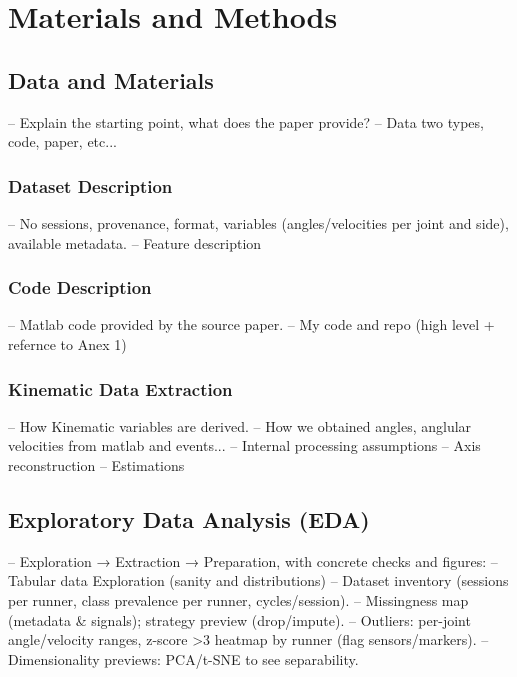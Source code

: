 \chapter{Materials and Methods}\label{chap:materials-methods}

\section{Data and Materials}\label{sec:method-data-materials}
-- Explain the starting point, what does the paper provide?
-- Data two types, code, paper, etc...

\subsection{Dataset Description}\label{subsec:method-dataset-description}
-- No sessions, provenance, format, variables (angles/velocities per joint and side), available metadata.
-- Feature description

\subsection{Code Description}\label{subsec:method-code-description}
-- Matlab code provided by the source paper.
-- My code and repo (high level + refernce to Anex 1)

\subsection{Kinematic Data Extraction}\label{subsec:kinematic-data-extraction}
-- How Kinematic variables are derived.
-- How we obtained angles, anglular velocities from matlab and events...
-- Internal processing assumptions
-- Axis reconstruction
-- Estimations



\section{Exploratory Data Analysis (EDA)}\label{sec:method-eda}
-- Exploration → Extraction → Preparation, with concrete checks and figures:
-- Tabular data Exploration (sanity and distributions)
-- Dataset inventory (sessions per runner, class prevalence per runner, cycles/session).
-- Missingness map (metadata \& signals); strategy preview (drop/impute).
-- Outliers: per-joint angle/velocity ranges, z-score >3 heatmap by runner (flag sensors/markers).
-- Dimensionality previews: PCA/t-SNE to see separability.


